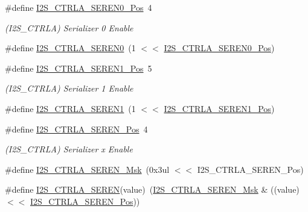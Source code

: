 \begin{DoxyCompactItemize}
\item 
\#define \mbox{\hyperlink{group___s_a_m_d21___i2_s_gad0a276f91a905c1b3b0ae697ddedecb3}{I2\+S\+\_\+\+C\+T\+R\+L\+A\+\_\+\+S\+E\+R\+E\+N0\+\_\+\+Pos}}~4
\begin{DoxyCompactList}\small\item\em (I2\+S\+\_\+\+C\+T\+R\+LA) Serializer 0 Enable \end{DoxyCompactList}\item 
\#define \mbox{\hyperlink{group___s_a_m_d21___i2_s_ga8e8c16ffaec81228f549550c9b872fef}{I2\+S\+\_\+\+C\+T\+R\+L\+A\+\_\+\+S\+E\+R\+E\+N0}}~(1 $<$$<$ \mbox{\hyperlink{group___s_a_m_d21___i2_s_gad0a276f91a905c1b3b0ae697ddedecb3}{I2\+S\+\_\+\+C\+T\+R\+L\+A\+\_\+\+S\+E\+R\+E\+N0\+\_\+\+Pos}})
\item 
\#define \mbox{\hyperlink{group___s_a_m_d21___i2_s_ga1c2f6c7c8172e0080d018a756e7bca17}{I2\+S\+\_\+\+C\+T\+R\+L\+A\+\_\+\+S\+E\+R\+E\+N1\+\_\+\+Pos}}~5
\begin{DoxyCompactList}\small\item\em (I2\+S\+\_\+\+C\+T\+R\+LA) Serializer 1 Enable \end{DoxyCompactList}\item 
\#define \mbox{\hyperlink{group___s_a_m_d21___i2_s_ga584abd8cf4a77739cffb83c1ac2de369}{I2\+S\+\_\+\+C\+T\+R\+L\+A\+\_\+\+S\+E\+R\+E\+N1}}~(1 $<$$<$ \mbox{\hyperlink{group___s_a_m_d21___i2_s_ga1c2f6c7c8172e0080d018a756e7bca17}{I2\+S\+\_\+\+C\+T\+R\+L\+A\+\_\+\+S\+E\+R\+E\+N1\+\_\+\+Pos}})
\item 
\#define \mbox{\hyperlink{group___s_a_m_d21___i2_s_ga033d75065d735c45f9f27263a3bc7063}{I2\+S\+\_\+\+C\+T\+R\+L\+A\+\_\+\+S\+E\+R\+E\+N\+\_\+\+Pos}}~4
\begin{DoxyCompactList}\small\item\em (I2\+S\+\_\+\+C\+T\+R\+LA) Serializer x Enable \end{DoxyCompactList}\item 
\#define \mbox{\hyperlink{group___s_a_m_d21___i2_s_gab614c369e0b1773c1c9d33b781d32246}{I2\+S\+\_\+\+C\+T\+R\+L\+A\+\_\+\+S\+E\+R\+E\+N\+\_\+\+Msk}}~(0x3ul $<$$<$ I2\+S\+\_\+\+C\+T\+R\+L\+A\+\_\+\+S\+E\+R\+E\+N\+\_\+\+Pos)
\item 
\#define \mbox{\hyperlink{group___s_a_m_d21___i2_s_ga5ff1fc6dd54e3756f364c85fd9eb4c54}{I2\+S\+\_\+\+C\+T\+R\+L\+A\+\_\+\+S\+E\+R\+EN}}(value)~(\mbox{\hyperlink{group___s_a_m_d21___i2_s_gab614c369e0b1773c1c9d33b781d32246}{I2\+S\+\_\+\+C\+T\+R\+L\+A\+\_\+\+S\+E\+R\+E\+N\+\_\+\+Msk}} \& ((value) $<$$<$ \mbox{\hyperlink{group___s_a_m_d21___i2_s_ga033d75065d735c45f9f27263a3bc7063}{I2\+S\+\_\+\+C\+T\+R\+L\+A\+\_\+\+S\+E\+R\+E\+N\+\_\+\+Pos}}))

\end{DoxyCompactItemize}
